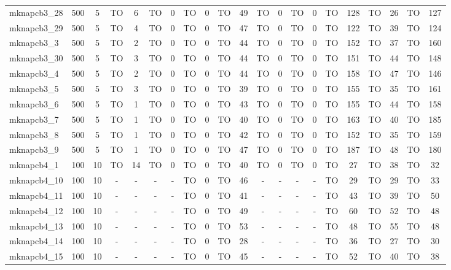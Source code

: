 \begin{sidewaystable}[!ht]
{\begin{tabular}{lcccccccccccccccccccc}
mknapcb3\_28 & 500 & 5 & TO & 6 & TO & 0 & TO & 0 & TO & 49 & TO & 0 & TO & 0 & TO & 128 & TO & 26 & TO & 127 \\
mknapcb3\_29 & 500 & 5 & TO & 4 & TO & 0 & TO & 0 & TO & 47 & TO & 0 & TO & 0 & TO & 122 & TO & 39 & TO & 124 \\
mknapcb3\_3 & 500 & 5 & TO & 2 & TO & 0 & TO & 0 & TO & 44 & TO & 0 & TO & 0 & TO & 152 & TO & 37 & TO & 160 \\
mknapcb3\_30 & 500 & 5 & TO & 3 & TO & 0 & TO & 0 & TO & 44 & TO & 0 & TO & 0 & TO & 151 & TO & 44 & TO & 148 \\
mknapcb3\_4 & 500 & 5 & TO & 2 & TO & 0 & TO & 0 & TO & 44 & TO & 0 & TO & 0 & TO & 158 & TO & 47 & TO & 146 \\
mknapcb3\_5 & 500 & 5 & TO & 3 & TO & 0 & TO & 0 & TO & 39 & TO & 0 & TO & 0 & TO & 155 & TO & 35 & TO & 161 \\
mknapcb3\_6 & 500 & 5 & TO & 1 & TO & 0 & TO & 0 & TO & 43 & TO & 0 & TO & 0 & TO & 155 & TO & 44 & TO & 158 \\
mknapcb3\_7 & 500 & 5 & TO & 1 & TO & 0 & TO & 0 & TO & 40 & TO & 0 & TO & 0 & TO & 163 & TO & 40 & TO & 185 \\
mknapcb3\_8 & 500 & 5 & TO & 1 & TO & 0 & TO & 0 & TO & 42 & TO & 0 & TO & 0 & TO & 152 & TO & 35 & TO & 159 \\
mknapcb3\_9 & 500 & 5 & TO & 1 & TO & 0 & TO & 0 & TO & 47 & TO & 0 & TO & 0 & TO & 187 & TO & 48 & TO & 180 \\
mknapcb4\_1 & 100 & 10 & TO & 14 & TO & 0 & TO & 0 & TO & 40 & TO & 0 & TO & 0 & TO & 27 & TO & 38 & TO & 32 \\
mknapcb4\_10 & 100 & 10 &  - &  - &  - &  - & TO & 0 & TO & 46 &  - &  - &  - &  - & TO & 29 & TO & 29 & TO & 33 \\
mknapcb4\_11 & 100 & 10 &  - &  - &  - &  - & TO & 0 & TO & 41 &  - &  - &  - &  - & TO & 43 & TO & 39 & TO & 50 \\
mknapcb4\_12 & 100 & 10 &  - &  - &  - &  - & TO & 0 & TO & 49 &  - &  - &  - &  - & TO & 60 & TO & 52 & TO & 48 \\
mknapcb4\_13 & 100 & 10 &  - &  - &  - &  - & TO & 0 & TO & 53 &  - &  - &  - &  - & TO & 48 & TO & 55 & TO & 48 \\
mknapcb4\_14 & 100 & 10 &  - &  - &  - &  - & TO & 0 & TO & 28 &  - &  - &  - &  - & TO & 36 & TO & 27 & TO & 30 \\
mknapcb4\_15 & 100 & 10 &  - &  - &  - &  - & TO & 0 & TO & 45 &  - &  - &  - &  - & TO & 52 & TO & 40 & TO & 38 \\

\end{tabular}}
\end{sidewaystable}
